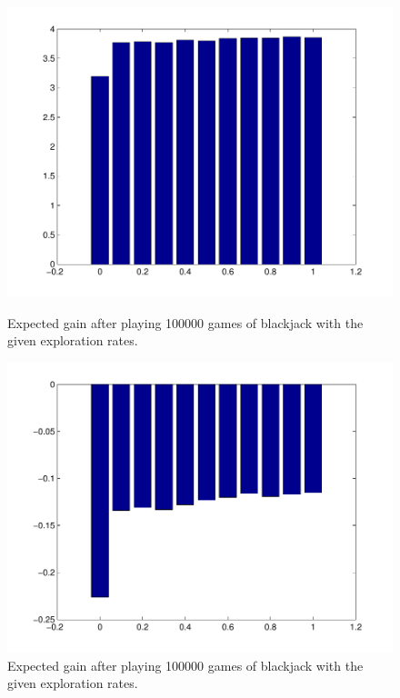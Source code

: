 \documentclass[12pt]{article}
\begin{document}
\begin{figure}[htbp!]
\centering
\begin{minipage}[t]{0.45\linewidth}
	\includegraphics[scale=0.4]{images/blackjackExpectedGain2}
	\caption{Expected gain after playing 100000 games of blackjack with the given exploration rates.}
	\label{fig:blackjackExpectedGain}
\end{minipage}
\quad
\begin{minipage}[t]{0.45\linewidth}
	\includegraphics[scale=0.4]{images/blackjackExpectedGain1}
	\caption{Expected gain after playing 100000 games of blackjack with the given exploration rates.}
	\label{fig:blackjackExpectedGain1}
\end{minipage}	
\end{figure}
\end{document}
